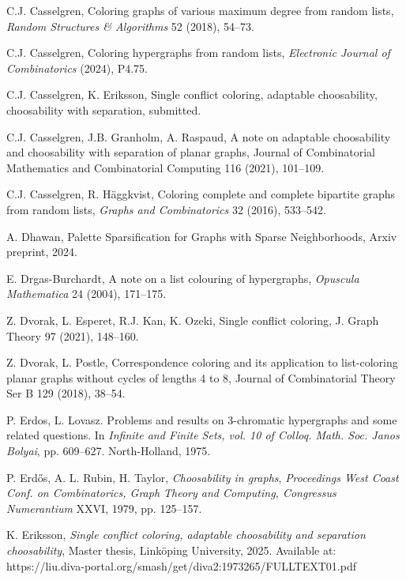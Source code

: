 \documentclass[12pt]{article}
\newcommand{\1}{\mathds{1}}
\begin{document}
\begin{thebibliography}{}
C.J. Casselgren,
Coloring graphs of various maximum degree from random lists,
\emph{Random Structures \& Algorithms} 52 (2018),
 54--73.

C.J. Casselgren,
Coloring hypergraphs from random lists, {\em Electronic Journal of Combinatorics} (2024),
P4.75.

C.J. Casselgren, K. Eriksson,
Single conflict coloring, adaptable choosability, choosability with separation,
submitted.

C.J. Casselgren, J.B. Granholm, A. Raspaud,
A note on adaptable choosability and choosability with separation of planar graphs,
 Journal of Combinatorial Mathematics and Combinatorial Computing 116 (2021), 101--109.

C.J. Casselgren, R. H\"aggkvist,
Coloring complete and complete bipartite graphs from random lists,
{\em Graphs and Combinatorics} 32 (2016), 533--542.

A. Dhawan,
Palette Sparsification for Graphs with Sparse Neighborhoods,
Arxiv preprint, 2024.

E. Drgas-Burchardt,
A note on a list colouring of hypergraphs,
{\em Opuscula Mathematica} 24 (2004), 171--175.

Z. Dvorak, L. Esperet, R.J. Kan, K. Ozeki,
Single conflict coloring,
J. Graph Theory 97 (2021), 148--160.

Z. Dvorak, L. Postle,
Correspondence coloring and its application to list-coloring planar graphs without cycles of lengths 4 to 8,
Journal of Combinatorial Theory Ser B 129 (2018), 38--54.

P. Erdos, L. Lovasz. Problems and results on 3-chromatic hypergraphs
and some related questions. In {\em Infinite and Finite Sets, vol. 10 of Colloq. Math. Soc. Janos Bolyai}, pp. 609--627. North-Holland, 1975.



P. Erd\H os, A. L. Rubin, H. Taylor, 
\emph{Choosability in graphs},
\emph{Proceedings West Coast Conf. on Combinatorics, Graph Theory and Computing,
Congressus Numerantium} XXVI, 1979, pp. 125--157.

K. Eriksson, {\em Single conflict coloring, adaptable choosability and separation choosability},
Master thesis, Link\"oping University, 2025.
Available at:
https://liu.diva-portal.org/smash/get/diva2:1973265/FULLTEXT01.pdf




\end{thebibliography}
\end{document}
